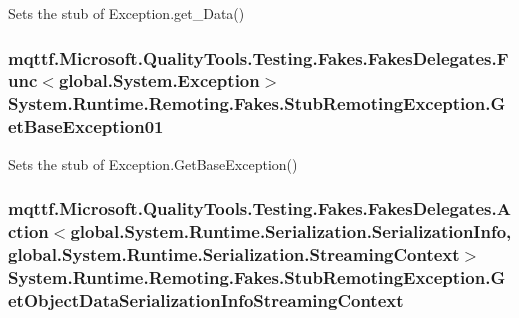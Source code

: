 Sets the stub of Exception.\-get\-\_\-\-Data()

\hypertarget{class_system_1_1_runtime_1_1_remoting_1_1_fakes_1_1_stub_remoting_exception_ac322efcf632a2529dcf0141972909a9f}{
\subsubsection[{Get\-Base\-Exception01}]{\setlength{\rightskip}{0pt plus 5cm}mqttf.\-Microsoft.\-Quality\-Tools.\-Testing.\-Fakes.\-Fakes\-Delegates.\-Func$<$global.\-System.\-Exception$>$ System.\-Runtime.\-Remoting.\-Fakes.\-Stub\-Remoting\-Exception.\-Get\-Base\-Exception01}}\label{class_system_1_1_runtime_1_1_remoting_1_1_fakes_1_1_stub_remoting_exception_ac322efcf632a2529dcf0141972909a9f}


Sets the stub of Exception.\-Get\-Base\-Exception()

\hypertarget{class_system_1_1_runtime_1_1_remoting_1_1_fakes_1_1_stub_remoting_exception_a0b2151664c03c0e7736b6e6df386caa3}{
\subsubsection[{Get\-Object\-Data\-Serialization\-Info\-Streaming\-Context}]{\setlength{\rightskip}{0pt plus 5cm}mqttf.\-Microsoft.\-Quality\-Tools.\-Testing.\-Fakes.\-Fakes\-Delegates.\-Action$<$global.\-System.\-Runtime.\-Serialization.\-Serialization\-Info, global.\-System.\-Runtime.\-Serialization.\-Streaming\-Context$>$ System.\-Runtime.\-Remoting.\-Fakes.\-Stub\-Remoting\-Exception.\-Get\-Object\-Data\-Serialization\-Info\-Streaming\-Context}}\label{class_system_1_1_runtime_1_1_remoting_1_1_fakes_1_1_stub_remoting_exception_a0b2151664c03c0e7736b6e6df386caa3}


